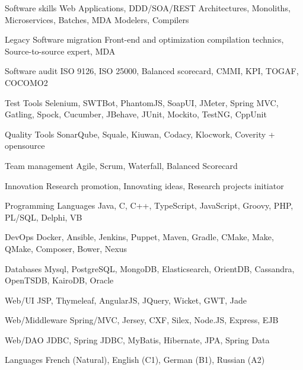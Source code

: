 

\begin{cvskills}

  \cvskill
  {Software skills} %
  {Web Applications, DDD/SOA/REST Architectures, Monoliths, Microservices, Batches, MDA Modelers, Compilers} %


  \cvskill
  {Legacy Software migration} %
  {Front-end and optimization compilation technics, Source-to-source expert, MDA} %


  \cvskill
  {Software audit} %
  {ISO 9126, ISO 25000, Balanced scorecard, CMMI, KPI, TOGAF, COCOMO2} %

  \cvskill
  {Test Tools} %
  {Selenium, SWTBot, PhantomJS, SoapUI, JMeter, Spring MVC, Gatling, Spock, Cucumber, JBehave, JUnit, Mockito, TestNG, CppUnit} %

  \cvskill
  {Quality Tools} %
  {SonarQube, Squale, Kiuwan, Codacy, Klocwork, Coverity + opensource} %


  \cvskill
  {Team management} %
  {Agile, Scrum, Waterfall, Balanced Scorecard} %

  \cvskill
  {Innovation} %
  {Research promotion, Innovating ideas, Research projects initiator} %

  \cvskill
  {Programming Languages} %
  {Java, C, C++, TypeScript, JavaScript, Groovy, PHP, PL/SQL, Delphi, VB} %
  
  \cvskill
  {DevOps} %
  {Docker, Ansible, Jenkins, Puppet, Maven, Gradle, CMake, Make, QMake, Composer, Bower, Nexus} %
  
  \cvskill
  {Databases} %
  {Mysql, PostgreSQL, MongoDB, Elasticsearch, OrientDB, Cassandra, OpenTSDB, KairoDB, Oracle} %
  
  \cvskill
  {Web/UI} %
  {JSP, Thymeleaf, AngularJS, JQuery, Wicket, GWT, Jade} %
  
  \cvskill
  {Web/Middleware} %
  {Spring/MVC, Jersey, CXF, Silex, Node.JS, Express, EJB} %
  
  
  \cvskill
  {Web/DAO} %
  {JDBC, Spring JDBC, MyBatis, Hibernate, JPA, Spring Data} %
  

  \cvskill
    {Languages} %
    {French (Natural), English (C1), German (B1), Russian (A2)} %

\end{cvskills}
